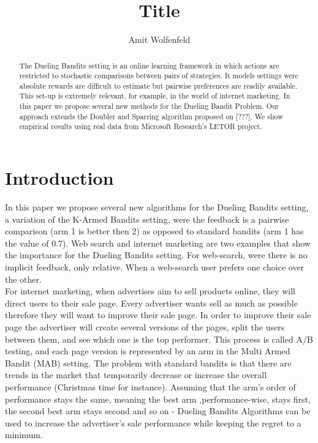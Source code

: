 \documentclass{llncs}
\author{Amit Wolfenfeld\inst{1}}
\institute{Technion}
\title{Title}
\begin{document}
\maketitle

\begin{abstract}
The Dueling Bandits setting is an online learning framework in which actions are restricted to stochastic comparisons between pairs of strategies.
It models settings were absolute rewards are difficult to estimate but pairwise preferences are readily available. This set-up is extremely relevant, for example, in the world of internet marketing.
In this paper we propose several new methods for the Dueling Bandit Problem. Our approach extends the Doubler and Sparring algorithm proposed on [???]. We show empirical results using real data from Microsoft Research's LETOR project.
\end{abstract}

\section{Introduction}
In this paper we propose several new algorithms for the Dueling Bandits setting, a variation of the K-Armed Bandits setting, were the feedback is a pairwise comparison (arm 1 is better then 2) as opposed to standard bandits (arm 1 has the value of 0.7).
Web search and internet marketing are two examples that show the importance for the Dueling Bandits setting. For web-search, were there is no implicit feedback, only relative. When a web-search user prefers one choice over the other.
\\
For internet marketing, when advertises aim to sell products online, they will direct users to their sale page. Every advertiser wants sell as much as possible therefore they will want to improve their sale page. In order to improve their sale page the advertiser will create several versions of the pages, split the users between them, and see which one is the top performer. This process is called A/B testing, and each page version is represented by an arm in the Multi Armed Bandit (MAB) setting. The problem with standard bandits is that there are trends in the market that temporarily decrease or increase the overall performance (Christmas time for instance). Assuming that the arm's order of performance stays the same, meaning the best arm ,performance-wise, stays first, the second best arm stays second and so on - Dueling Bandits Algorithms can be used to increase the advertiser's sale performance while keeping the regret to a minimum.
\end{document}
